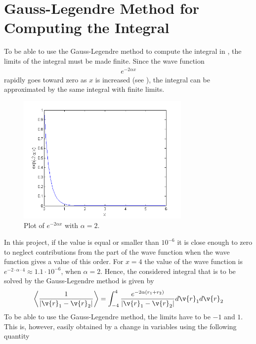 \section{Gauss-Legendre Method for Computing the Integral}
\label{sec:GaussLegendreMethod}

To be able to use the Gauss-Legendre method to compute the integral in , the limits of the integral must be made  finite.
Since the wave function 
\begin{align}
	e^{-2\alpha x}
\end{align}
rapidly goes toward zero as $x$ is increased (see ), the integral can be approximated  by the same integral with finite limits.

\begin{figure}[H]
	\centering
	\includegraphics[width=0.75\textwidth]{Figures/function_zeropoint.png}
	\caption{Plot of $e^{-2\alpha x}$ with $\alpha = 2$.}
	\label{fig:function_zeropoint}
\end{figure}
In this project, if the value is equal or smaller than $10^{-6}$ it is close enough to zero to neglect contributions from the part of the wave function when the wave function gives a value of this order.
For $x=4$ the value of the wave function is $e^{-2\cdot \alpha \cdot 4} \approx 1.1\cdot 10^{-6}$, when $\alpha = 2$.
Hence, the considered integral that is to be solved by the Gauss-Legendre method is given by
\begin{align}
   \left< \frac{1}{| \v{r}_1 - \v{r}_2 |} \right> 
   = \int _{-4} ^{4} \frac{e^{-2\alpha (r_1+r_2)}}{| \v{r}_1 - \v{r}_2 |} d \v{r}_1 d\v{r}_2
\label{eq:GLdMethod1}
\end{align} 
To be able to use the Gauss-Legendre method, the limits have to be $-1$ and $1$. 
This is, however, easily obtained by a change in variables using the following quantity
